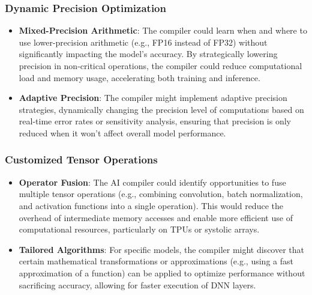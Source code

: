 \documentclass{article}
\begin{document}
\subsubsection{Dynamic Precision Optimization}
\begin{itemize}
    \item \textbf{Mixed-Precision Arithmetic}: The compiler could learn when and where to use lower-precision arithmetic (e.g., FP16 instead of FP32) without significantly impacting the model’s accuracy. By strategically lowering precision in non-critical operations, the compiler could reduce computational load and memory usage, accelerating both training and inference.
    \item \textbf{Adaptive Precision}: The compiler might implement adaptive precision strategies, dynamically changing the precision level of computations based on real-time error rates or sensitivity analysis, ensuring that precision is only reduced when it won’t affect overall model performance.
\end{itemize}

\subsubsection{Customized Tensor Operations}
\begin{itemize}
    \item \textbf{Operator Fusion}: The AI compiler could identify opportunities to fuse multiple tensor operations (e.g., combining convolution, batch normalization, and activation functions into a single operation). This would reduce the overhead of intermediate memory accesses and enable more efficient use of computational resources, particularly on TPUs or systolic arrays.
    \item \textbf{Tailored Algorithms}: For specific models, the compiler might discover that certain mathematical transformations or approximations (e.g., using a fast approximation of a function) can be applied to optimize performance without sacrificing accuracy, allowing for faster execution of DNN layers.
\end{itemize}
\end{document}
